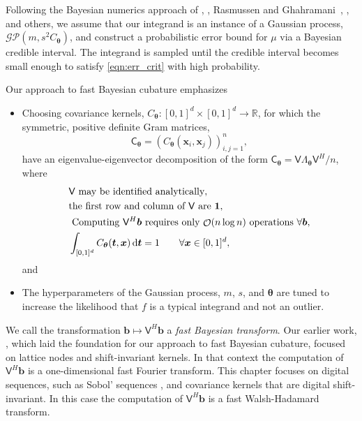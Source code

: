 \documentclass[graybox,footinfo]{svmult}
\DeclareMathOperator{\Order}{{\mathcal O}}
\newcommand{\bm}[1]{\boldsymbol{#1}}
\newcommand{\reals}{\mathbb{R}}
\newcommand{\vtheta}{{\bm{\theta}}}
\newcommand{\vb}{\bm{b}}
\newcommand{\vt}{\bm{t}}
\newcommand{\vx}{\bm{x}}
\newcommand{\vone}{\bm{1}}
\newcommand{\mC}{\mathsf{C}}
\newcommand{\mLambda}{\mathsf{\Lambda}}
\newcommand{\mV}{\mathsf{V}}
\begin{document}
Following the Bayesian numerics approach of \cite{Dia88a}, \cite{OHa91a}, Rasmussen and Ghahramani~\cite{RasGha03a}, \cite{BriEtal18a}, and others, we assume that our integrand is an instance of a Gaussian process, $\mathcal{GP}(m,s^2 C_\vtheta)$, and construct a probabilistic error bound for $\mu$ via a Bayesian credible interval.  The integrand is sampled until the credible interval becomes small enough to satisfy \eqref{eqn:err_crit} with high probability.  

Our approach to fast Bayesian cubature \cite{RatHic19a} emphasizes 
\begin{itemize}
    \item Choosing covariance kernels, $C_\vtheta:[0,1]^d \times [0,1]^d \to \reals$, for which the symmetric, positive definite Gram matrices, 
    \begin{equation} \label{eq:Gram}
        \mC_\vtheta = \left(  C_\vtheta(\vx_i,\vx_j)  \right)_{i,j=1}^n,
    \end{equation}
    have an eigenvalue-eigenvector decomposition of the form $\mC_\vtheta = \mV \mLambda_\vtheta \mV^H/n$, where
    \begin{subequations} \label{eq:fastcompAssump}
	\begin{align}
	\label{eq:fastcompAssumpA}
	& \mV \text{ may be identified analytically}, \\
	\label{eq:fastcompAssumpB}
	& \text{the first row and column of $\mV$ are } \vone, \\
	\label{eq:fastcompAssumpC}
	& \text{ Computing $\mV^H \vb$ requires only $\Order(n \log n)$ operations } \forall \vb, \\
	\label{addAssump}
    & \int_{[0,1]^d} C_\vtheta(\vt,\vx) \, \D \vt = 1 \qquad \forall \vx \in [0,1]^d,
	\end{align}
\end{subequations}
and
\item The hyperparameters of the Gaussian process, $m$, $s$, and $\vtheta$ are tuned to increase the likelihood that $f$ is a typical integrand and not an outlier.
\end{itemize}
We call the transformation $\vb \mapsto \mV^H \vb$ a \emph{fast Bayesian transform}. Our earlier work, \cite{RatHic19a}, which laid the foundation for our approach to fast Bayesian cubature, focused on lattice nodes and shift-invariant kernels. In that context the computation of $\mV^H \vb$ is a one-dimensional fast Fourier transform.  This chapter focuses on digital sequences, such as Sobol' sequences \cite{Sob67}, and covariance kernels that are digital shift-invariant.  In this case the computation of $\mV^H \vb$ is a fast Walsh-Hadamard transform. 
\end{document}
